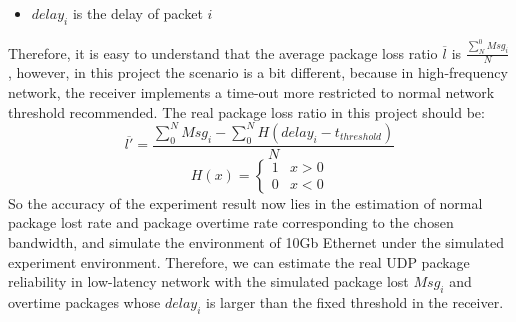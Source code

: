 \documentclass[11pt,openright,a4paper]{report}
\begin{document}
\begin{itemize}
	\item $delay_{i}$ is the delay of packet $i$
\end{itemize}
Therefore, it is easy to understand that the average package loss ratio $\overline{l}$ is $\frac{\sum_{N}^{0}Msg_{i}}{N}$, however, in this project the scenario is a bit different, because in high-frequency network, the receiver implements a time-out more restricted to normal network threshold recommended\cite{eggert2009tcp}. The real package loss ratio in this project should be:
\begin{equation}
	\overline{{l}'}=\frac{\sum_{0}^{N}Msg_{i}-\sum_{0}^{N} H(delay_{i}-t_{threshold})}{N}
\end{equation}
\begin{equation}
	H(x)=\begin{cases}
	1 & x>0
	\\
	0 & x<0
	\end{cases}
\end{equation}
So the accuracy of the experiment result now lies in the estimation of normal package lost rate and package overtime rate corresponding to the chosen bandwidth, and simulate the environment of 10Gb Ethernet under the simulated experiment environment. Therefore, we can estimate the real UDP package reliability in low-latency network with the simulated package lost $Msg_{i}$ and overtime packages whose $delay_{i}$ is larger than the fixed threshold in the receiver.\\
\end{document}
